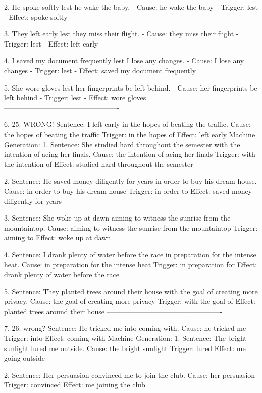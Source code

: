 2. He spoke softly lest he wake the baby.
   - Cause: he wake the baby
   - Trigger: lest
   - Effect: spoke softly

3. They left early lest they miss their flight.
   - Cause: they miss their flight
   - Trigger: lest
   - Effect: left early

4. I saved my document frequently lest I lose any changes.
   - Cause: I lose any changes
   - Trigger: lest
   - Effect: saved my document frequently

5. She wore gloves lest her fingerprints be left behind.
   - Cause: her fingerprints be left behind
   - Trigger: lest
   - Effect: wore gloves
-------------------------------------------------

6.
25. WRONG!
Sentence: I left early in the hopes of beating the traffic.
Cause: the hopes of beating the traffic
Trigger: in the hopes of
Effect: left early
Machine Generation: 
1. Sentence: She studied hard throughout the semester with the intention of acing her finals.
   Cause: the intention of acing her finals
   Trigger: with the intention of
   Effect: studied hard throughout the semester

2. Sentence: He saved money diligently for years in order to buy his dream house.
   Cause: in order to buy his dream house
   Trigger: in order to
   Effect: saved money diligently for years

3. Sentence: She woke up at dawn aiming to witness the sunrise from the mountaintop.
   Cause: aiming to witness the sunrise from the mountaintop
   Trigger: aiming to
   Effect: woke up at dawn

4. Sentence: I drank plenty of water before the race in preparation for the intense heat.
   Cause: in preparation for the intense heat
   Trigger: in preparation for
   Effect: drank plenty of water before the race

5. Sentence: They planted trees around their house with the goal of creating more privacy.
   Cause: the goal of creating more privacy
   Trigger: with the goal of
   Effect: planted trees around their house
-------------------------------------------------

7.
26. wrong?
Sentence: He tricked me into coming with.
Cause: he tricked me
Trigger: into
Effect: coming with
Machine Generation: 
1. Sentence: The bright sunlight lured me outside.
   Cause: the bright sunlight
   Trigger: lured
   Effect: me going outside

2. Sentence: Her persuasion convinced me to join the club.
   Cause: her persuasion
   Trigger: convinced
   Effect: me joining the club

